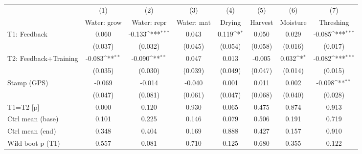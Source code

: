 {
\def\sym#1{\ifmmode^{#1}\else\(^{#1}\)\fi}
\begin{tabular}{l*{7}{c}}
\toprule
                    &\multicolumn{1}{c}{(1)}&\multicolumn{1}{c}{(2)}&\multicolumn{1}{c}{(3)}&\multicolumn{1}{c}{(4)}&\multicolumn{1}{c}{(5)}&\multicolumn{1}{c}{(6)}&\multicolumn{1}{c}{(7)}\\
                    &\multicolumn{1}{c}{Water: grow}&\multicolumn{1}{c}{Water: repr}&\multicolumn{1}{c}{Water: mat}&\multicolumn{1}{c}{Drying}&\multicolumn{1}{c}{Harvest}&\multicolumn{1}{c}{Moisture}&\multicolumn{1}{c}{Threshing}\\
\midrule
T1: Feedback        &       0.060         &      -0.133\sym{***}&       0.043         &       0.119\sym{*}  &       0.050         &       0.029         &      -0.085\sym{***}\\
                    &     (0.037)         &     (0.032)         &     (0.045)         &     (0.054)         &     (0.058)         &     (0.016)         &     (0.017)         \\
T2: Feedback+Training&      -0.083\sym{**} &      -0.090\sym{**} &       0.047         &       0.013         &      -0.005         &       0.032\sym{*}  &      -0.082\sym{***}\\
                    &     (0.035)         &     (0.030)         &     (0.039)         &     (0.049)         &     (0.047)         &     (0.014)         &     (0.015)         \\
Stamp (GPS)         &      -0.069         &      -0.014         &      -0.040         &       0.001         &       0.011         &       0.002         &      -0.098\sym{**} \\
                    &     (0.047)         &     (0.081)         &     (0.061)         &     (0.047)         &     (0.068)         &     (0.040)         &     (0.028)         \\
\midrule
T1=T2 [p]           &       0.000         &       0.120         &       0.930         &       0.065         &       0.475         &       0.874         &       0.913         \\
Ctrl mean (base)    &       0.101         &       0.225         &       0.146         &       0.079         &       0.506         &       0.191         &       0.719         \\
Ctrl mean (end)     &       0.348         &       0.404         &       0.169         &       0.888         &       0.427         &       0.157         &       0.910         \\
Wild-boot p (T1)    &       0.557         &       0.081         &       0.710         &       0.125         &       0.680         &       0.355         &       0.122         \\

\end{tabular}}

